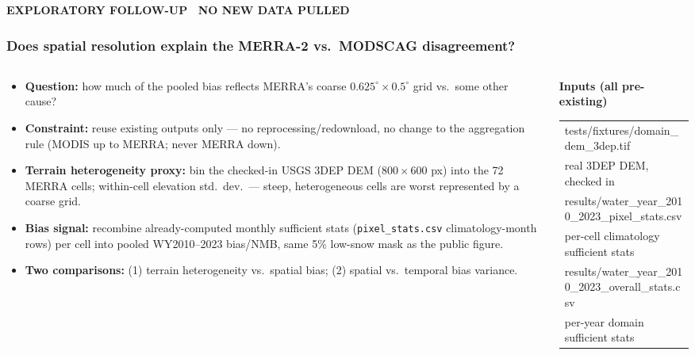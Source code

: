 \documentclass[aspectratio=169]{beamer}
\newcommand{\kicker}[1]{{\footnotesize\bfseries\color{accent} #1}\\[2pt]}
\begin{document}
\begin{frame}[t]
\kicker{EXPLORATORY FOLLOW-UP \textperiodcentered\ NO NEW DATA PULLED}
\frametitle{Does spatial resolution explain the MERRA-2 vs.\ MODSCAG disagreement?}

\begin{columns}[t]
\begin{column}{0.56\textwidth}
\tiny
\begin{itemize}
  \setlength{\itemsep}{2pt}
  \item[] \textbf{Question:} how much of the pooled bias reflects MERRA's coarse $0.625^\circ\!\times\!0.5^\circ$ grid vs.\ some other cause?
  \item[] \textbf{Constraint:} reuse existing outputs only --- no reprocessing/redownload, no change to the aggregation rule (MODIS up to MERRA; never MERRA down).
  \item[] \textbf{Terrain heterogeneity proxy:} bin the checked-in USGS 3DEP DEM ($800\times600$ px) into the 72 MERRA cells; within-cell elevation std.\ dev.\ --- steep, heterogeneous cells are worst represented by a coarse grid.
  \item[] \textbf{Bias signal:} recombine already-computed monthly sufficient stats (\texttt{pixel\_stats.csv} climatology-month rows) per cell into pooled WY2010--2023 bias/NMB, same 5\% low-snow mask as the public figure.
  \item[] \textbf{Two comparisons:} (1) terrain heterogeneity vs.\ spatial bias; (2) spatial vs.\ temporal bias variance.
\end{itemize}
\end{column}

\begin{column}{0.42\textwidth}
\footnotesize
\textbf{Inputs (all pre-existing)}
\vspace{2pt}

\begin{tabular}{@{}p{\linewidth}@{}}
\color{accent}\ttfamily\tiny tests/fixtures/domain\_dem\_3dep.tif \\
\color{muted}\scriptsize real 3DEP DEM, checked in \\[2pt]
\color{accent}\ttfamily\tiny results/water\_year\_2010\_2023\_pixel\_stats.csv \\
\color{muted}\scriptsize per-cell climatology sufficient stats \\[2pt]
\color{accent}\ttfamily\tiny results/water\_year\_2010\_2023\_overall\_stats.csv \\
\color{muted}\scriptsize per-year domain sufficient stats \\
\end{tabular}


\end{column}
\end{columns}
\end{frame}
\end{document}
